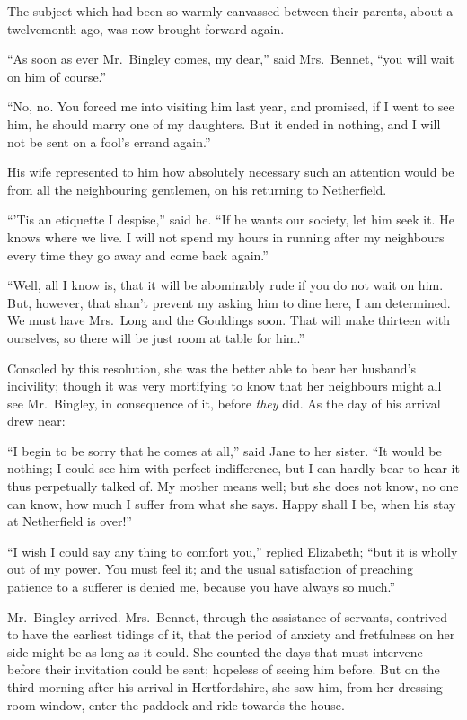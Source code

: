\documentclass[12pt,english]{book}
\begin{document}
The subject which had been so warmly canvassed between their parents,
about a twelvemonth ago, was now brought forward again.

{}``As soon as ever Mr.\ Bingley comes, my dear,'' said Mrs.\ Bennet,
{}``you will wait on him of course.''

{}``No, no. You forced me into visiting him last year, and promised,
if I went to see him, he should marry one of my daughters. But it
ended in nothing, and I will not be sent on a fool's errand again.''

His wife represented to him how absolutely necessary such an attention
would be from all the neighbouring gentlemen, on his returning to
Netherfield.

{}``'Tis an etiquette I despise,'' said he. {}``If he wants our
society, let him seek it. He knows where we live. I will not spend
my hours in running after my neighbours every time they go away and
come back again.''

{}``Well, all I know is, that it will be abominably rude if you do
not wait on him. But, however, that shan't prevent my asking him to
dine here, I am determined. We must have Mrs.\ Long and the Gouldings
soon. That will make thirteen with ourselves, so there will be just
room at table for him.''

Consoled by this resolution, she was the better able to bear her husband's
incivility; though it was very mortifying to know that her neighbours
might all see Mr.\ Bingley, in consequence of it, before \textit{they}
did. As the day of his arrival drew near:

{}``I begin to be sorry that he comes at all,'' said Jane to her
sister. {}``It would be nothing; I could see him with perfect indifference,
but I can hardly bear to hear it thus perpetually talked of. My mother
means well; but she does not know, no one can know, how much I suffer
from what she says. Happy shall I be, when his stay at Netherfield
is over!''\ 

{}``I wish I could say any thing to comfort you,'' replied Elizabeth;
{}``but it is wholly out of my power. You must feel it; and the usual
satisfaction of preaching patience to a sufferer is denied me, because
you have always so much.''

Mr.\ Bingley arrived. Mrs.\ Bennet, through the assistance of servants,
contrived to have the earliest tidings of it, that the period of anxiety
and fretfulness on her side might be as long as it could. She counted
the days that must intervene before their invitation could be sent;
hopeless of seeing him before. But on the third morning after his
arrival in Hertfordshire, she saw him, from her dressing-room window,
enter the paddock and ride towards the house.
\end{document}
